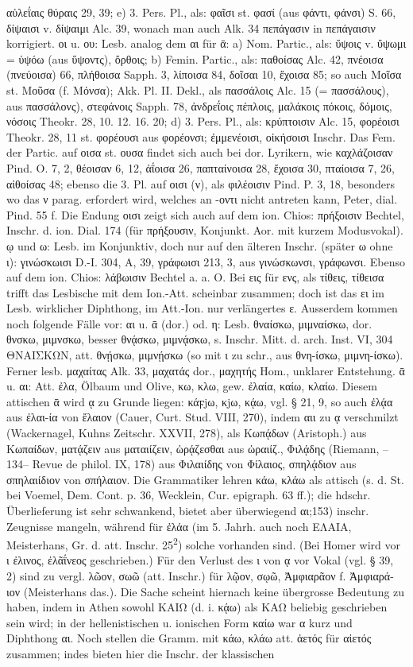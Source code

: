 αὐλεΐαις θύραις 29, 39; e) 3. Pers. Pl., als: φαῖσι st. φασί (aus φάντι, φάνσι) S. 66, δίψαισι v. δίψαιμι Alc. 39, wonach man auch Alk. 34 πεπάγασιν in πεπάγαισιν korrigiert. οι u. ου: Lesb. analog dem αι für ᾱ: a) Nom. Partic., als: ὔψοις v. ὔψωμι = ὑψόω (aus ὕψοντς), ὄρθοις; b) Femin. Partic., als: παθοίσας Alc. 42, πνέοισα (πνεύοισα) 66, πλήθοισα Sapph. 3, λίποισα 84, δοῖσαι 10, ἔχοισα 85; so auch Μοῖσα st. Μοῦσα (f. Μόνσα); Akk. Pl. II. Dekl., als πασσάλοις Alc. 15 (= πασσάλους), aus πασσάλονς), στεφάνοις Sapph. 78, ἀνδρεΐοις πέπλοις, μαλάκοις πόκοις, δόμοις, νόσοις Theokr. 28, 10. 12. 16. 20; d) 3. Pers. Pl., als: κρύπτοισιν Alc. 15, φορέοισι Theokr. 28, 11 st. φορέουσι aus φορέονσι; ἐμμενέοισι, οἰκήσοισι Inschr. Das Fem. der Partic. auf οισα st. ουσα findet sich auch bei dor. Lyrikern, wie καχλάζοισαν Pind. O. 7, 2, θέοισαν 6, 12, ἀΐοισα 26, παπταίνοισα 28, ἔχοισα 30, πταίοισα 7, 26, αἰθοίσας 48; ebenso die 3. Pl. auf οισι (ν), als φιλέοισιν Pind. P. 3, 18, besonders wo das ν parag. erfordert wird, welches an -οντι nicht antreten kann, Peter, dial. Pind. 55 f. Die Endung οισι zeigt sich auch auf dem ion. Chios: πρήξοισιν Bechtel, Inschr. d. ion. Dial. 174 (für πρήξουσιν, Konjunkt. Aor. mit kurzem Modusvokal). ῳ und ω: Lesb. im Konjunktiv, doch nur auf den älteren Inschr. (später ω ohne ι): γινώσκωισι D.-I. 304, Α, 39, γράφωισι 213, 3, aus γινώσκωνσι, γράφωνσι. Ebenso auf dem ion. Chios: λάβωισιν Bechtel a. a. O. Bei εις für ενς, als τίθεις, τίθεισα trifft das Lesbische mit dem Ion.-Att. scheinbar zusammen; doch ist das ει im Lesb. wirklicher Diphthong, im Att.-Ion. nur verlängertes ε. Ausserdem kommen noch folgende Fälle vor: αι u. ᾱ (dor.) od. η: Lesb. θναίσκω, μιμναίσκω, dor. θνσκω, μιμνσκω, besser θνᾴσκω, μιμνᾴσκω, s. Inschr. Mitt. d. arch. Inst. VI, 304 ΘΝΑΙΣΚΩΝ, att. θνῄσκω, μιμνῄσκω (so mit ι zu schr., aus θνη-ίσκω, μιμνη-ίσκω). Ferner lesb. μαχαίτας Alk. 33, μαχατάς dor., μαχητής Hom., unklarer Entstehung. ᾱ u. αι: Att. ἐλα, Ölbaum und Olive, κω, κλω, gew. ἐλαία, καίω, κλαίω. Diesem attischen ᾱ wird ᾳ zu Grunde liegen: κάϝjω, κjω, κᾴω, vgl. § 21, 9, so auch ἐλᾴα aus ἐλαι-ία von ἔλαιον (Cauer, Curt. Stud. VIII, 270), indem αιι zu ᾳ verschmilzt (Wackernagel, Kuhns Zeitschr. XXVII, 278), als Κωπᾴδων (Aristoph.) aus Κωπαίδων, ματᾴζειν aus ματαιίζειν, ὡρᾴζεσθαι aus ὡραιίζ., Φιλᾴδης (Riemann, --134-- Revue de philol. IX, 178) aus Φιλαιίδης von Φίλαιος, σπηλᾴδιον aus σπηλαιίδιον von σπήλαιον. Die Grammatiker lehren κάω, κλάω als attisch (s. d. St. bei Voemel, Dem. Cont. p. 36, Wecklein, Cur. epigraph. 63 ff.); die hdschr. Überlieferung ist sehr schwankend, bietet aber überwiegend αι;153) inschr. Zeugnisse mangeln, während für ἐλάα (im 5. Jahrh. auch noch ΕΛΑΙΑ, Meisterhans, Gr. d. att. Inschr. 25\textsuperscript{2}) solche vorhanden sind. (Bei Homer wird vor ι ἐλινος, ἐλᾶΐνεος geschrieben.) Für den Verlust des ι von ᾳ vor Vokal (vgl. § 39, 2) sind zu vergl. λῶον, σωῶ (att. Inschr.) für λῷον, σῳῶ, Ἀμφιαρᾶον f. Ἀμφιαρά-ιον (Meisterhans das.). Die Sache scheint hiernach keine übergrosse Bedeutung zu haben, indem in Athen sowohl ΚΑΙΩ (d. i. κᾴω) als ΚΑΩ beliebig geschrieben sein wird; in der hellenistischen u. ionischen Form καίω war α kurz und Diphthong αι. Noch stellen die Gramm. mit κάω, κλάω att. ἀετός für αἰετός zusammen; indes bieten hier die Inschr. der klassischen 